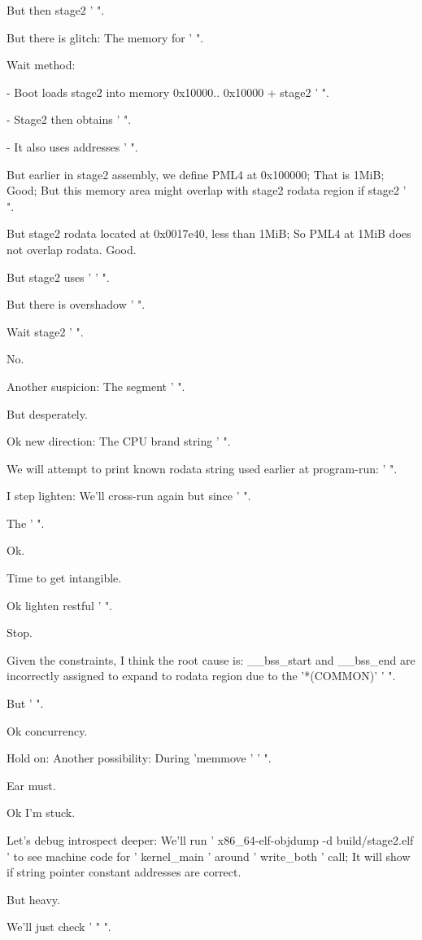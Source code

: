 \begin{decodedreasoningpanel}
But then stage2 ' ".

But there is glitch: The memory for ' ".

Wait method:

- Boot loads stage2 into memory 0x10000.. 0x10000 + stage2 ' ".

- Stage2 then obtains ' ".

- It also uses addresses ' ".

But earlier in stage2 assembly, we define PML4 at 0x100000; That is 1MiB; Good; But this memory area might overlap with stage2 rodata region if stage2 ' ".

But stage2 rodata located at 0x0017e40, less than 1MiB; So PML4 at 1MiB does not overlap rodata. Good.

But stage2 uses ' ' ".

But there is overshadow ' ".

Wait stage2 ' ".

No.

Another suspicion: The segment ' ".

But desperately.

Ok new direction: The CPU brand string ' ".

We will attempt to print known rodata string used earlier at program-run: ' ".

I step lighten: We'll cross-run again but since ' ".

The ' ".

Ok.

Time to get intangible.

Ok lighten restful ' ".

Stop.

Given the constraints, I think the root cause is: \_\_bss\_start and \_\_bss\_end are incorrectly assigned to expand to rodata region due to the '*(COMMON)' ' ".

But ' ".

Ok concurrency.

Hold on: Another possibility: During 'memmove ' ' ".

Ear must.

Ok I'm stuck.

Let's debug introspect deeper: We'll run ' x86\_64-elf-objdump -d build/stage2.elf ' to see machine code for ' kernel\_main ' around ' write\_both ' call; It will show if string pointer constant addresses are correct.

But heavy.

We'll just check ' " ".


\end{decodedreasoningpanel}
